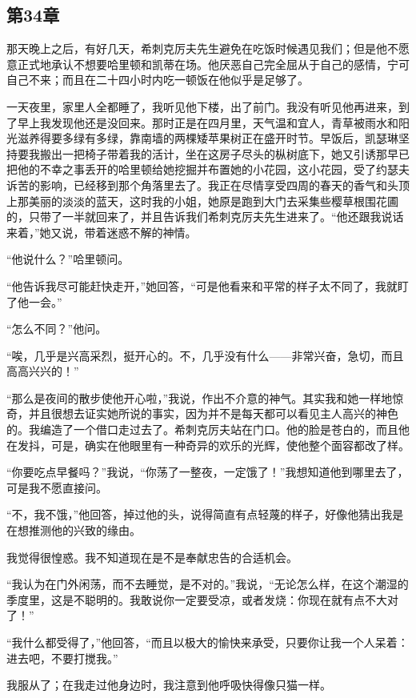 \subsection{第34章}

\par 那天晚上之后，有好几天，希刺克厉夫先生避免在吃饭时候遇见我们；但是他不愿意正式地承认不想要哈里顿和凯蒂在场。他厌恶自己完全屈从于自己的感情，宁可自己不来；而且在二十四小时内吃一顿饭在他似乎是足够了。
\par 一天夜里，家里人全都睡了，我听见他下楼，出了前门。我没有听见他再进来，到了早上我发现他还是没回来。那时正是在四月里，天气温和宜人，青草被雨水和阳光滋养得要多绿有多绿，靠南墙的两棵矮苹果树正在盛开时节。早饭后，凯瑟琳坚持要我搬出一把椅子带着我的活计，坐在这房子尽头的枞树底下，她又引诱那早已把他的不幸之事丢开的哈里顿给她挖掘并布置她的小花园，这小花园，受了约瑟夫诉苦的影响，已经移到那个角落里去了。我正在尽情享受四周的春天的香气和头顶上那美丽的淡淡的蓝天，这时我的小姐，她原是跑到大门去采集些樱草根围花圃的，只带了一半就回来了，并且告诉我们希刺克厉夫先生进来了。“他还跟我说话来着，”她又说，带着迷惑不解的神情。
\par “他说什么？”哈里顿问。
\par “他告诉我尽可能赶快走开，”她回答，“可是他看来和平常的样子太不同了，我就盯了他一会。”
\par “怎么不同？”他问。
\par “唉，几乎是兴高采烈，挺开心的。不，几乎没有什么——非常兴奋，急切，而且高高兴兴的！”
\par “那么是夜间的散步使他开心啦，”我说，作出不介意的神气。其实我和她一样地惊奇，并且很想去证实她所说的事实，因为并不是每天都可以看见主人高兴的神色的。我编造了一个借口走过去了。希刺克厉夫站在门口。他的脸是苍白的，而且他在发抖，可是，确实在他眼里有一种奇异的欢乐的光辉，使他整个面容都改了样。
\par “你要吃点早餐吗？”我说，“你荡了一整夜，一定饿了！”我想知道他到哪里去了，可是我不愿直接问。
\par “不，我不饿，”他回答，掉过他的头，说得简直有点轻蔑的样子，好像他猜出我是在想推测他的兴致的缘由。
\par 我觉得很惶惑。我不知道现在是不是奉献忠告的合适机会。
\par “我认为在门外闲荡，而不去睡觉，是不对的。”我说，“无论怎么样，在这个潮湿的季度里，这是不聪明的。我敢说你一定要受凉，或者发烧：你现在就有点不大对了！”
\par “我什么都受得了，”他回答，“而且以极大的愉快来承受，只要你让我一个人呆着：进去吧，不要打搅我。”
\par 我服从了；在我走过他身边时，我注意到他呼吸快得像只猫一样。
